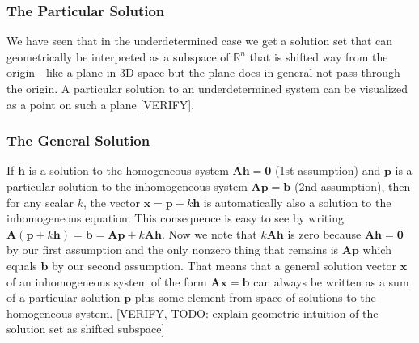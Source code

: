 
\subsubsection{The Particular Solution}
We have seen that in the underdetermined case we get a solution set that can geometrically be interpreted as a subspace of $\mathbb{R}^n$ that is shifted way from the origin - like a plane in 3D space but the plane does in general not pass through the origin. A particular solution to an underdetermined system can be visualized as a point on such a plane [VERIFY]. 

\subsubsection{The General Solution}
If $\mathbf{h}$ is a solution to the homogeneous system $\mathbf{A h = 0}$ (1st assumption) and $\mathbf{p}$ is a particular solution to the inhomogeneous system $\mathbf{A p = b}$ (2nd assumption), then for any scalar $k$, the vector $\mathbf{x} = \mathbf{p} + k \mathbf{h}$ is automatically also a solution to the inhomogeneous equation. This consequence is easy to see by writing $\mathbf{A} (\mathbf{p} + k \mathbf{h}) = \mathbf{b} = \mathbf{A p} + k \mathbf{A h}$. Now we note that $k \mathbf{A h}$ is zero because $\mathbf{A h = 0}$ by our first assumption and the only nonzero thing that remains is $\mathbf{A p}$ which equals $\mathbf{b}$ by our second assumption. That means that a general solution vector $\mathbf{x}$ of an inhomogeneous system of the form $\mathbf{A x = b}$ can always be written as a sum of a particular solution $\mathbf{p}$ plus some element from space of solutions to the homogeneous system. [VERIFY, TODO: explain geometric intuition of the solution set as shifted subspace]



